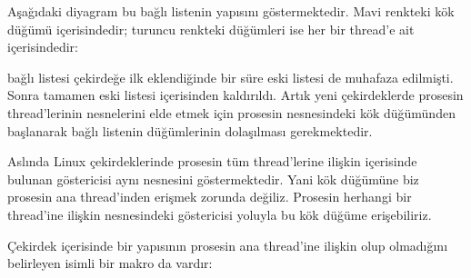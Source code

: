 \documentclass[a4paper,10pt,turkish]{sphinxmanual}
\begin{document}
\sphinxAtStartPar
Aşağıdaki diyagram bu bağlı listenin yapısını göstermektedir. Mavi renkteki  kök düğümü
 içerisindedir; turuncu renkteki  düğümleri ise her bir thread’e ait
 içerisindedir:


\sphinxAtStartPar
{} bağlı listesi çekirdeğe ilk eklendiğinde bir süre eski  listesi de
muhafaza edilmişti. Sonra tamamen eski  listesi  içerisinden kaldırıldı.
Artık yeni çekirdeklerde prosesin thread’lerinin  nesnelerini elde etmek için prosesin
 nesnesindeki  kök düğümünden başlanarak bağlı listenin 
düğümlerinin dolaşılması gerekmektedir.

\sphinxAtStartPar
Aslında Linux çekirdeklerinde prosesin tüm thread’lerine ilişkin  içerisinde bulunan
 göstericisi aynı  nesnesini göstermektedir. Yani  kök düğümüne
biz prosesin ana thread’inden erişmek zorunda değiliz. Prosesin herhangi bir thread’ine ilişkin
 nesnesindeki  göstericisi yoluyla bu kök düğüme erişebiliriz.

\sphinxAtStartPar
Çekirdek içerisinde bir  yapısının prosesin ana thread’ine ilişkin olup olmadığını
belirleyen  isimli bir makro da vardır:

\begin{sphinxVerbatim}[commandchars=\\\{\}]

\end{sphinxVerbatim}
\end{document}
